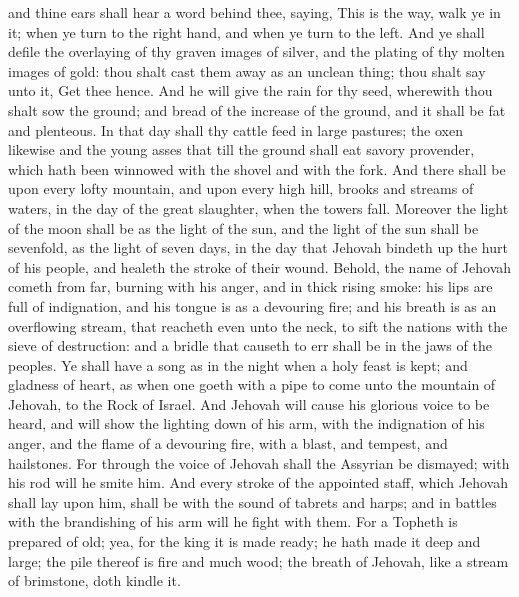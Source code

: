and thine ears shall hear a word behind thee, saying, This is the way, walk ye in it; when ye turn to the right hand, and when ye turn to the left. And ye shall defile the overlaying of thy graven images of silver, and the plating of thy molten images of gold: thou shalt cast them away as an unclean thing; thou shalt say unto it, Get thee hence.  And he will give the rain for thy seed, wherewith thou shalt sow the ground; and bread of the increase of the ground, and it shall be fat and plenteous. In that day shall thy cattle feed in large pastures; the oxen likewise and the young asses that till the ground shall eat savory provender, which hath been winnowed with the shovel and with the fork. And there shall be upon every lofty mountain, and upon every high hill, brooks and streams of waters, in the day of the great slaughter, when the towers fall. Moreover the light of the moon shall be as the light of the sun, and the light of the sun shall be sevenfold, as the light of seven days, in the day that Jehovah bindeth up the hurt of his people, and healeth the stroke of their wound.  Behold, the name of Jehovah cometh from far, burning with his anger, and in thick rising smoke: his lips are full of indignation, and his tongue is as a devouring fire; and his breath is as an overflowing stream, that reacheth even unto the neck, to sift the nations with the sieve of destruction: and a bridle that causeth to err shall be in the jaws of the peoples. Ye shall have a song as in the night when a holy feast is kept; and gladness of heart, as when one goeth with a pipe to come unto the mountain of Jehovah, to the Rock of Israel. And Jehovah will cause his glorious voice to be heard, and will show the lighting down of his arm, with the indignation of his anger, and the flame of a devouring fire, with a blast, and tempest, and hailstones. For through the voice of Jehovah shall the Assyrian be dismayed; with his rod will he smite him. And every stroke of the appointed staff, which Jehovah shall lay upon him, shall be with the sound of tabrets and harps; and in battles with the brandishing of his arm will he fight with them. For a Topheth is prepared of old; yea, for the king it is made ready; he hath made it deep and large; the pile thereof is fire and much wood; the breath of Jehovah, like a stream of brimstone, doth kindle it. 

